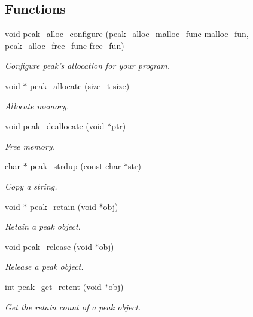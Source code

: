 \subsection*{Functions}
\begin{CompactItemize}
\item 
void \hyperlink{group__alloc_ga2}{peak\_\-alloc\_\-configure} (\hyperlink{group__alloc_ga0}{peak\_\-alloc\_\-malloc\_\-func} malloc\_\-fun, \hyperlink{group__alloc_ga1}{peak\_\-alloc\_\-free\_\-func} free\_\-fun)
\begin{CompactList}\small\item\em Configure peak's allocation for your program. \item\end{CompactList}\item 
void $\ast$ \hyperlink{group__alloc_ga3}{peak\_\-allocate} (size\_\-t size)
\begin{CompactList}\small\item\em Allocate memory. \item\end{CompactList}\item 
void \hyperlink{group__alloc_ga4}{peak\_\-deallocate} (void $\ast$ptr)
\begin{CompactList}\small\item\em Free memory. \item\end{CompactList}\item 
char $\ast$ \hyperlink{group__alloc_ga5}{peak\_\-strdup} (const char $\ast$str)
\begin{CompactList}\small\item\em Copy a string. \item\end{CompactList}\item 
void $\ast$ \hyperlink{group__alloc_ga6}{peak\_\-retain} (void $\ast$obj)
\begin{CompactList}\small\item\em Retain a peak object. \item\end{CompactList}\item 
void \hyperlink{group__alloc_ga7}{peak\_\-release} (void $\ast$obj)
\begin{CompactList}\small\item\em Release a peak object. \item\end{CompactList}\item 
int \hyperlink{group__alloc_ga8}{peak\_\-get\_\-retcnt} (void $\ast$obj)
\begin{CompactList}\small\item\em Get the retain count of a peak object. \item\end{CompactList}\end{CompactItemize}


